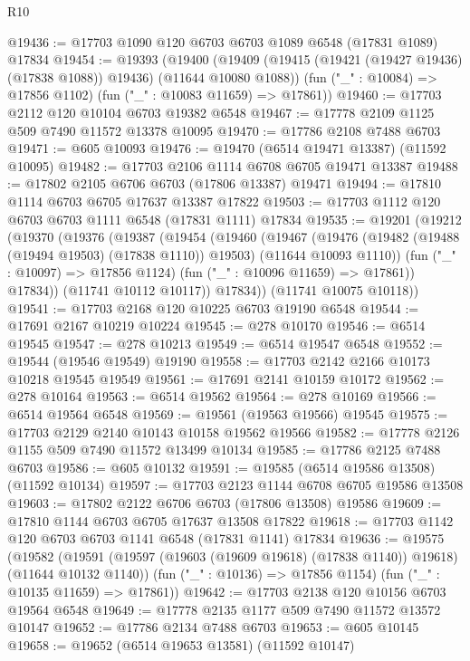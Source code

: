 \begin{lexlean}{R10}
\begin{coremodule}
{{{{{{{{{{{{{{{{{{{{{{{{{{{{{{{{{{{{{{{{{{{{{{{{{{{{{{{{{{{{{{{{{{{{{{{{{{{{{{{{{{{{@19436 := @17703 @1090 @120 @6703 @6703 @1089 @6548 (@17831 @1089) @17834
@19454 := @19393
    (@19400
      (@19409 (@19415 (@19421 (@19427 @19436) (@17838 @1088)) @19436) (@11644 @10080 @1088))
      (fun ("_" : @10084) => @17856 @1102)
      (fun ("_" : @10083 @11659) => @17861))
@19460 := @17703 @2112 @120 @10104 @6703 @19382 @6548
@19467 := @17778 @2109 @1125 @509 @7490 @11572 @13378 @10095
@19470 := @17786 @2108 @7488 @6703
@19471 := @605 @10093
@19476 := @19470 (@6514 @19471 @13387) (@11592 @10095)
@19482 := @17703 @2106 @1114 @6708 @6705 @19471 @13387
@19488 := @17802 @2105 @6706 @6703 (@17806 @13387) @19471
@19494 := @17810 @1114 @6703 @6705 @17637 @13387 @17822
@19503 := @17703 @1112 @120 @6703 @6703 @1111 @6548 (@17831 @1111) @17834
@19535 := @19201
    (@19212
      (@19370
        (@19376
          (@19387
            (@19454
              (@19460
                (@19467
                  (@19476
                    (@19482 (@19488 (@19494 @19503) (@17838 @1110)) @19503)
                    (@11644 @10093 @1110))
                  (fun ("_" : @10097) => @17856 @1124)
                  (fun ("_" : @10096 @11659) => @17861))
                @17834))
            (@11741 @10112 @10117))
          @17834))
      (@11741 @10075 @10118))
@19541 := @17703 @2168 @120 @10225 @6703 @19190 @6548
@19544 := @17691 @2167 @10219 @10224
@19545 := @278 @10170
@19546 := @6514 @19545
@19547 := @278 @10213
@19549 := @6514 @19547 @6548
@19552 := @19544 (@19546 @19549) @19190
@19558 := @17703 @2142 @2166 @10173 @10218 @19545 @19549
@19561 := @17691 @2141 @10159 @10172
@19562 := @278 @10164
@19563 := @6514 @19562
@19564 := @278 @10169
@19566 := @6514 @19564 @6548
@19569 := @19561 (@19563 @19566) @19545
@19575 := @17703 @2129 @2140 @10143 @10158 @19562 @19566
@19582 := @17778 @2126 @1155 @509 @7490 @11572 @13499 @10134
@19585 := @17786 @2125 @7488 @6703
@19586 := @605 @10132
@19591 := @19585 (@6514 @19586 @13508) (@11592 @10134)
@19597 := @17703 @2123 @1144 @6708 @6705 @19586 @13508
@19603 := @17802 @2122 @6706 @6703 (@17806 @13508) @19586
@19609 := @17810 @1144 @6703 @6705 @17637 @13508 @17822
@19618 := @17703 @1142 @120 @6703 @6703 @1141 @6548 (@17831 @1141) @17834
@19636 := @19575
    (@19582
      (@19591 (@19597 (@19603 (@19609 @19618) (@17838 @1140)) @19618) (@11644 @10132 @1140))
      (fun ("_" : @10136) => @17856 @1154)
      (fun ("_" : @10135 @11659) => @17861))
@19642 := @17703 @2138 @120 @10156 @6703 @19564 @6548
@19649 := @17778 @2135 @1177 @509 @7490 @11572 @13572 @10147
@19652 := @17786 @2134 @7488 @6703
@19653 := @605 @10145
@19658 := @19652 (@6514 @19653 @13581) (@11592 @10147)
}}}}}}}}}}}}}}}}}}}}}}}}}}}}}}}}}}}}}}}}}}}}}}}}}}}}}}}}}}}}}}}}}}}}}}}}}}}}}}}}}}}}
\end{coremodule}
\end{lexlean}
